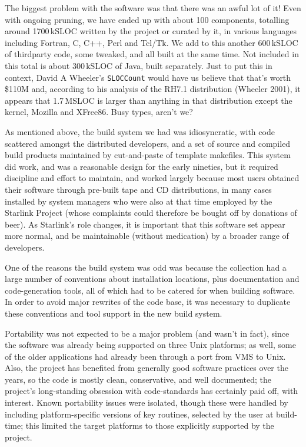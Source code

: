 \documentclass[11pt,twoside]{article}
\begin{document}
The biggest problem with the software was that there was an awful lot
of it!  Even with ongoing pruning, we have ended up with about 100
components, totalling around 1700\,kSLOC written by the project or
curated by it, in various languages
including Fortran, C, C++, Perl and Tcl/Tk.  We add to this another
600\,kSLOC of thirdparty code, some tweaked, and all built at the same
time.  Not included in this total is about 300\,kSLOC of Java,
built separately.  Just to put this in context, David A
Wheeler's \texttt{SLOCCount} would have us believe that that's worth
\$110M and, according to his analysis of the RH7.1 distribution
(Wheeler 2001), it appears that 1.7\,MSLOC is larger than anything in
that distribution except the kernel, Mozilla and XFree86.  Busy types,
aren't we?

As mentioned above, the build system we had was idiosyncratic, with
code scattered amongst the distributed developers, and a set of source
and compiled build products maintained by cut-and-paste of template
makefiles.  This system did work, and was a reasonable design for the
early nineties, but it required discipline and effort to maintain, and
worked largely because most users obtained their software through
pre-built tape and CD distributions, in many cases installed by system
managers who were also at that time employed by the Starlink Project
(whose complaints could therefore be bought off by donations of beer).
As Starlink's role changes, it is important that this software set
appear more normal, and be maintainable (without medication) by a
broader range of developers.

One of the reasons the build system was odd was because the collection
had a large number of conventions about installation locations, plus
documentation and code-generation tools, all of which had to be
catered for when building software.  In order to avoid major rewrites
of the code base, it was necessary to duplicate these conventions and
tool support in the new build system.

Portability was not expected to be a major problem (and wasn't in
fact), since the software was already being supported on three Unix
platforms; as well, some of the older applications had already been
through a port from VMS to Unix.  Also, the project has benefited from
generally good software practices over the years, so the code is
mostly clean, conservative, and well documented; the project's
long-standing obsession with code-standards has certainly paid off,
with interest.  Known portability issues were isolated, though these
were handled by including platform-specific versions of key routines,
selected by the user at build-time; this limited the target platforms
to those explicitly supported by the project.
\end{document}
